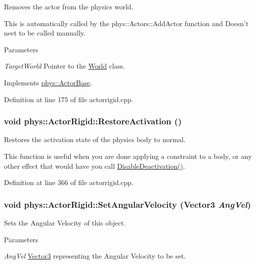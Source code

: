 Removes the actor from the physics world. \par
 This is automatically called by the phys::Actors::AddActor function and Doesn't neet to be called manually. 
\begin{DoxyParams}{Parameters}
\item[{\em TargetWorld}]Pointer to the \hyperlink{classphys_1_1World}{World} class. \end{DoxyParams}


Implements \hyperlink{classphys_1_1ActorBase_aaa787de7ec5d7d1d8428ea78f37bcb40}{phys::ActorBase}.



Definition at line 175 of file actorrigid.cpp.

\hypertarget{classphys_1_1ActorRigid_a99af341e186505a330f6634b7f6ad542}{
\subsubsection[{RestoreActivation}]{\setlength{\rightskip}{0pt plus 5cm}void phys::ActorRigid::RestoreActivation ()}}
\label{d8/d71/classphys_1_1ActorRigid_a99af341e186505a330f6634b7f6ad542}


Restores the activation state of the physics body to normal. 

This function is useful when you are done applying a constraint to a body, or any other effect that would have you call \hyperlink{classphys_1_1ActorRigid_ad74da4da12bbb44b3e5ae22007c98573}{DisableDeactivation()}. 

Definition at line 366 of file actorrigid.cpp.

\hypertarget{classphys_1_1ActorRigid_a00ae9cd063f7f879d6bee15c807101d2}{
\subsubsection[{SetAngularVelocity}]{\setlength{\rightskip}{0pt plus 5cm}void phys::ActorRigid::SetAngularVelocity ({\bf Vector3} {\em AngVel})}}
\label{d8/d71/classphys_1_1ActorRigid_a00ae9cd063f7f879d6bee15c807101d2}


Sets the Angular Velocity of this object. 


\begin{DoxyParams}{Parameters}
\item[{\em AngVel}]\hyperlink{classphys_1_1Vector3}{Vector3} representing the Angular Velocity to be set. \end{DoxyParams}


